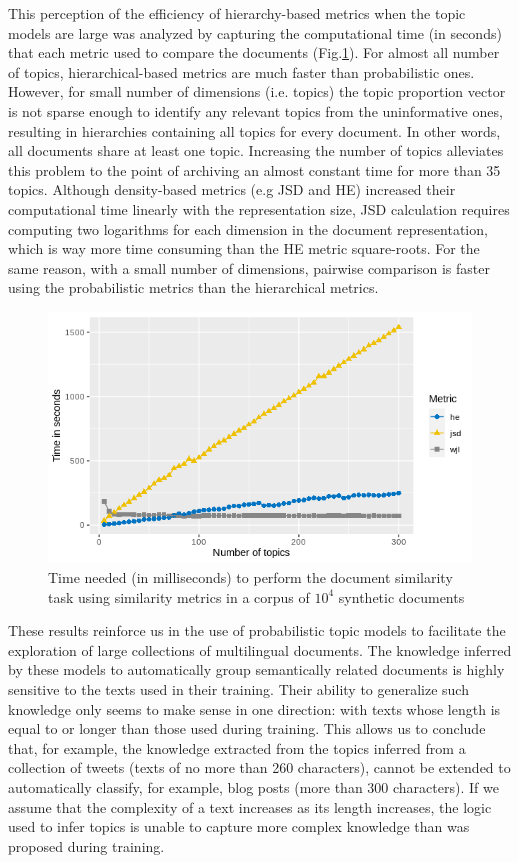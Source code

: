This perception of the efficiency of hierarchy-based metrics when the topic models are large was analyzed by capturing the computational time (in seconds) that each metric used to compare the documents (Fig.\ref{fig:compare_time_metric}). For almost all number of topics, hierarchical-based metrics are much faster than probabilistic ones. However, for small number of dimensions (i.e. topics) the topic proportion vector is not sparse enough to identify any relevant topics from the uninformative ones, resulting in hierarchies containing all topics for every document. In other words, all documents share at least one topic. Increasing the number of topics alleviates this problem to the point of archiving an almost constant time for more than 35 topics.  Although density-based metrics (e.g JSD and HE) increased their computational time linearly with the representation size, JSD calculation requires computing two logarithms for each dimension in the document representation, which is way more time consuming than the HE metric square-roots. For the same reason, with a small number of dimensions, pairwise comparison is faster using the probabilistic metrics than the hierarchical metrics. 

\begin{figure}[ht]
    \centering
    \includegraphics[width=0.8\linewidth]{time_comp.png}
    \caption{Time needed (in milliseconds) to perform the document similarity \\ task using similarity metrics in a corpus of $10^4$ synthetic documents }
    \label{fig:compare_time_metric}
\end{figure}

These results reinforce us in the use of probabilistic topic models to facilitate the exploration of large collections of multilingual documents. The knowledge inferred by these models to automatically group semantically related documents is highly sensitive to the texts used in their training. Their ability to generalize such knowledge only seems to make sense in one direction: with texts whose length is equal to or longer than those used during training. This allows us to conclude that, for example, the knowledge extracted from the topics inferred from a collection of tweets (texts of no more than 260 characters), cannot be extended to automatically classify, for example, blog posts (more than 300 characters). If we assume that the complexity of a text increases as its length increases, the logic used to infer topics is unable to capture more complex knowledge than was proposed during training.


